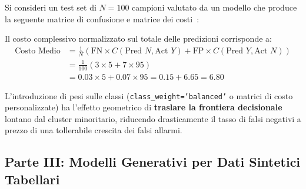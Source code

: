 \begin{example}
Si consideri un test set di $N = 100$ campioni valutato da un modello che produce la seguente matrice di confusione e matrice dei costi~\cite{mannocci2026imbalanced}:
\begin{table}[H]
\centering
\caption{Confronto tra Matrice di Confusione e Matrice dei Costi su $N = 100$ record.}
\label{tab:dm-cost-matrix-example}
\vspace{2mm}
\end{table}

\noindent
Il costo complessivo normalizzato sul totale delle predizioni corrisponde a:
\begin{align*}
    \text{Costo Medio} &= \frac{1}{N} \left( \text{FN} \times C(\text{Pred } N, \text{Act } Y) + \text{FP} \times C(\text{Pred } Y, \text{Act } N) \right) \\
    &= \frac{1}{100} \left( 3 \times 5 + 7 \times 95 \right) \\
    &= 0.03 \times 5 + 0.07 \times 95 = 0.15 + 6.65 = 6.80
\end{align*}
\end{example}

L'introduzione di pesi sulle classi (\texttt{class\_weight='balanced'} o matrici di costo personalizzate) ha l'effetto geometrico di \textbf{traslare la frontiera decisionale} lontano dal cluster minoritario, riducendo drasticamente il tasso di falsi negativi a prezzo di una tollerabile crescita dei falsi allarmi.
\FloatBarrier
\subsection{Parte III: Modelli Generativi per Dati Sintetici Tabellari}
\label{sec:dm-generative-models}

